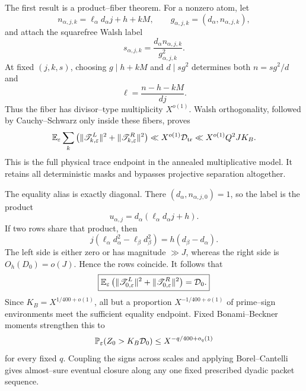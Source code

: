 The first result is a product--fiber theorem.  For a nonzero atom, let
\begin{equation}
 n_{\alpha,j,k}=\ell_\alpha d_\alpha j+h+kM,
 \qquad
 g_{\alpha,j,k}=(d_\alpha,n_{\alpha,j,k}),
 \label{eq:tpc43-intro-ng}
\end{equation}
and attach the squarefree Walsh label
\begin{equation}
 s_{\alpha,j,k}
 =\frac{d_\alpha n_{\alpha,j,k}}{g_{\alpha,j,k}^2}.
 \label{eq:tpc43-intro-label}
\end{equation}
At fixed \((j,k,s)\), choosing
\(g\mid h+kM\) and \(d\mid sg^2\) determines both
\(n=sg^2/d\) and
\begin{equation}
 \ell=\frac{n-h-kM}{dj}.
 \label{eq:tpc43-intro-row-recovery}
\end{equation}
Thus the fiber has divisor--type multiplicity \(X^{o(1)}\).  Walsh
orthogonality, followed by Cauchy--Schwarz only inside these fibers,
proves
\begin{equation}
 \mathbb E_\varepsilon
 \sum_k\left(
 \|\mathscr T_{k,\varepsilon}^L\|^2
 +\|\mathscr T_{k,\varepsilon}^R\|^2
 \right)
 \ll X^{o(1)}\mathcal D_{\rm tr}
 \ll X^{o(1)}Q^2JK_B.
 \label{eq:tpc43-intro-trace-theorem}
\end{equation}
This is the full physical trace endpoint in the annealed multiplicative
model.  It retains all deterministic masks and bypasses projective
separation altogether.

The equality alias is exactly diagonal.  There
\((d_\alpha,n_{\alpha,j,0})=1\), so the label is the product
\begin{equation}
 u_{\alpha,j}
 =d_\alpha(\ell_\alpha d_\alpha j+h).
 \label{eq:tpc43-intro-fused-label}
\end{equation}
If two rows share that product, then
\begin{equation}
 j(\ell_\alpha d_\alpha^2-\ell_\beta d_\beta^2)
 =h(d_\beta-d_\alpha).
 \label{eq:tpc43-intro-rigidity-equation}
\end{equation}
The left side is either zero or has magnitude \(\gg J\), whereas the
right side is \(O_h(D_0)=o(J)\).  Hence the rows coincide.  It follows
that
\begin{equation}
 \boxed{
 \mathbb E_\varepsilon\left(
 \|\mathscr T_{0,\varepsilon}^L\|^2
 +\|\mathscr T_{0,\varepsilon}^R\|^2
 \right)=\mathcal D_0.}
 \label{eq:tpc43-intro-exact-zero}
\end{equation}
Since \(K_B=X^{1/400+o(1)}\), all but a proportion
\(X^{-1/400+o(1)}\) of prime--sign environments meet the sufficient
equality endpoint.  Fixed Bonami--Beckner moments strengthen this to
\begin{equation}
 \mathbb P_\varepsilon(Z_0>K_B\mathcal D_0)
 \le X^{-q/400+o_q(1)}
 \label{eq:tpc43-intro-high-tail}
\end{equation}
for every fixed \(q\).  Coupling the signs across scales and applying
Borel--Cantelli gives almost--sure eventual closure along any one fixed
prescribed dyadic packet sequence.

